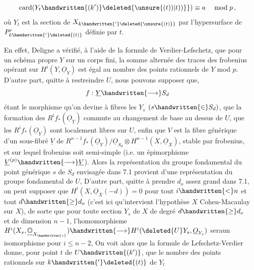 
\[
\operatorname{card}(Y_t\handwritten{(k')}\deleted{\unsure{(t))|t))}}) \equiv a \quad \bmod p\,,
\]
\margin{\handwritten{$|$}}où $Y_t$ est la section de $X_{k\handwritten{'}\deleted{\unsure{(t)}}}$ par l'hypersurface de $P^r_{k\handwritten{'}\deleted{(t)}}$ définie par $t$.

En effet, Deligne a vérifié, à l'aide de la formule de Verdier-Lefschetz, que pour un schéma propre $Y$ sur un corps fini, la somme alternée des traces  des frobenius opérant sur $H^i(Y,\underline{O}_Y)$ est  égal au nombre des points rationnels de $Y$ mod $p$. D'autre part, quitte à restreindre $U$, nous pouvons supposer que,
\[
f:\underline{Y}\handwritten{\longrightarrow} S_d
\]
étant le morphisme qu'on devine à fibres les $Y_s$ $(s\handwritten{\in}S_d)$, que  la formation des $R^if_*(\underline{O}_{\underline{Y}})$ commute au changement de base au dessus de $U$,  que les $R^if_*(\underline{O}_Y)$ sont localement libres sur $U$, enfin que $V$ est la fibre  générique d'un sous-fibré $\underline{V}$ de $R^{n-1}f_*(\underline{O}_Y)/\underline{O}_{S_d}\otimes H^{n-1}(X,\underline{O}_X)$, stable par frobenius, et sur lequel frobenius soit semi-simple (i.e. un épimorphisme $\underline{V}^{(p)}\handwritten{\longrightarrow}\underline{V}$). Alors la représentation du groupe fondamental du point générique $s$ de $S_d$ envisagée dans 7.1 provient d'une représentation du groupe fondamental  \handwritten{$\pi$} de $U$,  D'autre part, quitte à prendre $d_o$ assez grand dans 7.1, on peut supposer que  $H^i(X,\underline{O}_X(-d))=0$ pour tout $i\handwritten{<}n$ et tout $d\handwritten{\geq}d_o$ (c'est ici qu'intervient l'hypothèse $X$ Cohen-Macaulay sur $X$), de sorte que pour toute section $Y_s$ de $X$ de degré $d\handwritten{\geq}d_o$ et de dimension $n-1$, l'homomorphisme $H^i(X_s,\underline{\mathbb{O}}_{X_{\handwritten{s}}})\handwritten{\longrightarrow}H^i(\deleted{U}Y_s,\underline{O}_{Y_s})$ sera\handwritten{$|$}un isomorphisme pour $i\leq n-2$,  On voit alors que la formule de Lefschetz-Verdier donne, pour  point  $t$ de $U\handwritten{(k')}$, que le nombre des points rationnels sur $k\handwritten{'}\deleted{(t)}$ de $Y_t$ 
